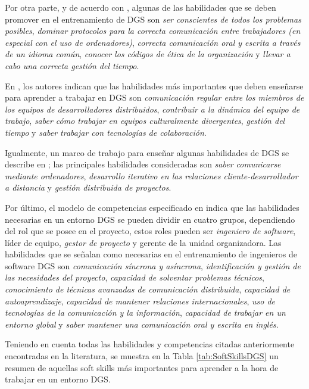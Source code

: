 Por otra parte, y de acuerdo con \cite{monasor2010training}, algunas de las habilidades que se deben promover en el entrenamiento de DGS son \emph{ser conscientes de todos los problemas posibles}, \emph{dominar protocolos para la correcta comunicación entre trabajadores (en especial con el uso de ordenadores)}, \emph{correcta comunicación oral y escrita a través de un idioma común}, \emph{conocer los códigos de ética de la organización} y \emph{llevar a cabo una correcta gestión del tiempo}.

En \cite{paasivaara2013teaching}, los autores indican que las habilidades más importantes que deben enseñarse para aprender a trabajar en DGS son \emph{comunicación regular entre los miembros de los equipos de desarrolladores distribuidos}, \emph{contribuir a la dinámica del equipo de trabajo}, \emph{saber cómo trabajar en equipos culturalmente divergentes}, \emph{gestión del tiempo} y \emph{saber trabajar con tecnologías de colaboración}.

Igualmente, un marco de trabajo para enseñar algunas habilidades de DGS se describe en \cite{damian2006instructional}; las principales habilidades consideradas son \emph{saber comunicarse mediante ordenadores}, \emph{desarrollo iterativo en las relaciones cliente-desarrollador a distancia} y \emph{gestión distribuida de proyectos}.

Por último, el modelo de competencias especificado en \cite{saldana2014skills} indica que las habilidades necesarias en un entorno DGS se pueden dividir en cuatro grupos, dependiendo del rol que se posee en el proyecto, estos roles pueden ser \emph{ingeniero de software}, líder de equipo, \emph{gestor de proyecto} y gerente de la unidad organizadora. Las habilidades que se señalan como necesarias en el entrenamiento de ingenieros de software DGS son \emph{comunicación síncrona y asíncrona}, \emph{identificación  y gestión de las necesidades del proyecto}, \emph{capacidad de solventar problemas técnicos}, \emph{conocimiento de técnicas avanzadas de comunicación distribuida}, \emph{capacidad de autoaprendizaje}, \emph{capacidad de mantener relaciones internacionales}, \emph{uso de tecnologías de la comunicación y la información}, \emph{capacidad de trabajar en un entorno global} y \emph{saber mantener una comunicación oral y escrita en inglés}.

Teniendo en cuenta todas las habilidades y competencias citadas anteriormente encontradas en la literatura, se muestra en la Tabla \ref{tab:SoftSkillsDGS} un resumen de aquellas soft skills más importantes para aprender a la hora de trabajar en un entorno DGS.

